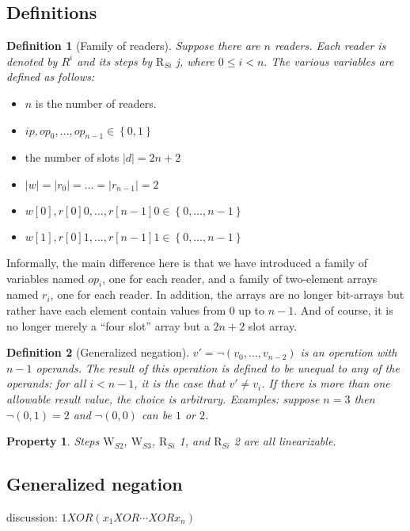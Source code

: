 \documentclass{article}
\newtheorem{defn}{Definition}
\newtheorem{prop}{Property}
\newcommand\set[1]{\left\{#1\right\}}
\newcommand\len[1]{\left|#1\right|}
\newcommand\paren[1]{\left({#1}\right)}
\newcommand\RS[1]{\ensuremath{\text{R}_{S#1}}}
\newcommand\WS[1]{\ensuremath{\text{W}_{S#1}}}
\newcommand\W[1]{\ensuremath{w\left[#1\right]}}
\newcommand\R[1]{\ensuremath{r\left[#1\right]}}
\newcommand\ip{\ensuremath{ip}}
\newcommand\op{\ensuremath{op}}
\newcommand\gneg[1]{\neg\paren{#1}}
\begin{document}
\subsection{Definitions}
\begin{defn}[Family of readers]
  Suppose there are $n$ readers. Each reader is denoted by $R^i$ and
  its steps by \RS i j, where $0\leq i<n$. The various variables are
  defined as follows:
\end{defn}

\begin{itemize}
\item $n$ is the number of readers.
\item $\ip,\op_0,\ldots,\op_{n-1}\in\set{0,1}$
\item the number of slots $\len{d}=2n+2$
\item $\len{w}=\len{r_0}=\ldots=\len{r_{n-1}}=2$
\item $\W 0,\R 0 0,\ldots,\R {n-1} 0\in\set{0,\ldots,n-1}$
\item $\W 1,\R 0 1,\ldots,\R {n-1} 1\in\set{0,\ldots,n-1}$
\end{itemize}

Informally, the main difference here is that we have introduced a
family of variables named $\op_i$, one for each reader, and a family
of two-element arrays named $r_i$, one for each reader. In addition,
the arrays are no longer bit-arrays but rather have each element
contain values from 0 up to $n-1$. And of course, it is no longer
merely a ``four slot'' array but a $2n+2$ slot array.

\begin{defn}[Generalized negation]
  $v' = \gneg{v_0,\ldots,v_{n-2}}$ is an operation with $n-1$
  operands. The result of this operation is defined to be unequal to
  any of the operands: for all $i<n-1$, it is the case that $v'\neq
  v_i$.  If there is more than one allowable result value, the choice
  is arbitrary. Examples: suppose $n=3$ then $\gneg{0,1}=2$ and
  $\gneg{0,0}$ can be $1$ or $2$.
\end{defn}

\begin{prop}
  Steps \WS2, \WS3, \RS i 1, and \RS i 2 are all linearizable.
\end{prop}

\subsection{Generalized negation}

discussion: $1 XOR (x_1 XOR \cdots XOR x_n)$
\end{document}
